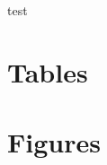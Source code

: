 \begin{appendices}

test

\chapter{Tables}



%



\chapter{Figures}
\begin{figure}
\centering

\caption[ShortCap]{}
\label{fig:app:tsinit}
\end{figure}





\end{appendices}